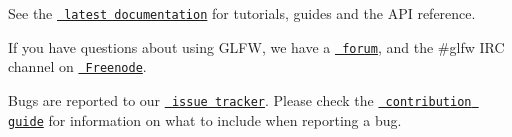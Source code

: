 See the \href{http://www.glfw.org/docs/latest/}{\texttt{ latest documentation}} for tutorials, guides and the A\+PI reference.

If you have questions about using G\+L\+FW, we have a \href{https://discourse.glfw.org/}{\texttt{ forum}}, and the {\ttfamily \#glfw} I\+RC channel on \href{http://freenode.net/}{\texttt{ Freenode}}.

Bugs are reported to our \href{https://github.com/glfw/glfw/issues}{\texttt{ issue tracker}}. Please check the \href{https://github.com/glfw/glfw/blob/master/docs/CONTRIBUTING.md}{\texttt{ contribution guide}} for information on what to include when reporting a bug. 